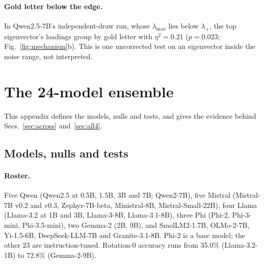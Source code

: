 \documentclass{article}
\theoremstyle{plain}
\theoremstyle{remark}
\begin{document}
\paragraph{Gold letter below the edge.} In Qwen2.5-7B's independent-draw
run, whose $\lambda_{\max}$ lies below $\lambda_+$, the top eigenvector's
loadings group by gold letter with $\eta^2=0.21$ ($p=0.023$;
Fig.~\ref{fig:mechanism}b). This is one uncorrected test on an
eigenvector inside the noise range, not interpreted.

\section{The 24-model ensemble}
\label{app:ensemble}

This appendix defines the models, nulls and tests, and gives the
evidence behind Secs.~\ref{sec:across} and~\ref{sec:all4}.

\subsection{Models, nulls and tests}

\paragraph{Roster.} Five Qwen (Qwen2.5 at 0.5B, 1.5B, 3B and 7B;
Qwen2-7B), five Mistral (Mistral-7B v0.2 and v0.3, Zephyr-7B-beta,
Ministral-8B, Mistral-Small-22B), four Llama (Llama-3.2 at 1B and 3B,
Llama-3-8B, Llama-3.1-8B), three Phi (Phi-2, Phi-3-mini, Phi-3.5-mini),
two Gemma-2 (2B, 9B), and SmolLM2-1.7B, OLMo-2-7B, Yi-1.5-6B,
DeepSeek-LLM-7B and Granite-3.1-8B. Phi-2 is a base model; the other 23
are instruction-tuned. Rotation-0 accuracy runs from 35.0\%
(Llama-3.2-1B) to 72.8\% (Gemma-2-9B).
\end{document}
